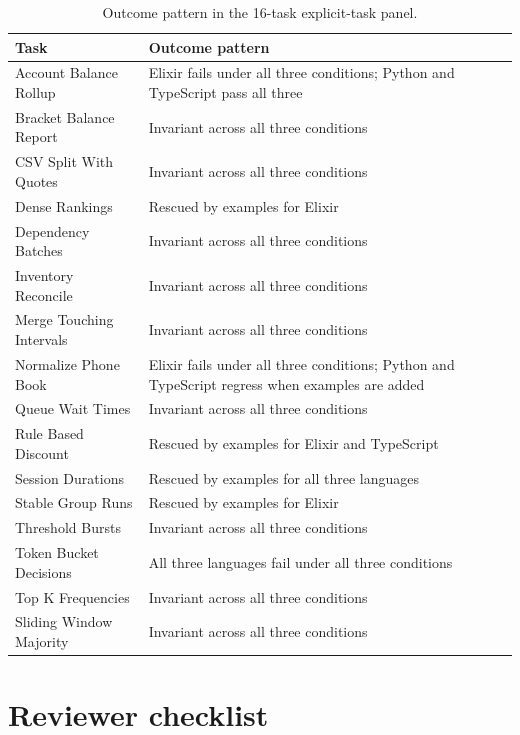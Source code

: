 \documentclass[11pt]{article}
\begin{document}
\begin{table}[H]
\centering
\caption{Outcome pattern in the 16-task explicit-task panel.}
\label{tab:paneltasks}
\small
\begin{tabularx}{\textwidth}{l X}
\toprule
Task & Outcome pattern \\
\midrule
Account Balance Rollup & Elixir fails under all three conditions; Python and TypeScript pass all three \\
Bracket Balance Report & Invariant across all three conditions \\
CSV Split With Quotes & Invariant across all three conditions \\
Dense Rankings & Rescued by examples for Elixir \\
Dependency Batches & Invariant across all three conditions \\
Inventory Reconcile & Invariant across all three conditions \\
Merge Touching Intervals & Invariant across all three conditions \\
Normalize Phone Book & Elixir fails under all three conditions; Python and TypeScript regress when examples are added \\
Queue Wait Times & Invariant across all three conditions \\
Rule Based Discount & Rescued by examples for Elixir and TypeScript \\
Session Durations & Rescued by examples for all three languages \\
Stable Group Runs & Rescued by examples for Elixir \\
Threshold Bursts & Invariant across all three conditions \\
Token Bucket Decisions & All three languages fail under all three conditions \\
Top K Frequencies & Invariant across all three conditions \\
Sliding Window Majority & Invariant across all three conditions \\
\bottomrule
\end{tabularx}
\end{table}

\section{Reviewer checklist}
\end{document}
